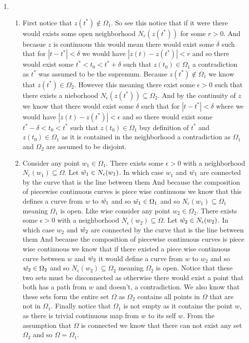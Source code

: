 \documentclass[12pt]{amsart}
\theoremstyle{definition}
\newcommand{\se}{\subseteq}
\begin{document}
\begin{enumerate}
\item 
\begin{enumerate}[label=(\alph*)]
    \item First notice that $z(t^*)\not\in \Omega_1$. So see this notice that if it were there would exists some open neighborhood $N_r(z(t^*))$ for some $r>0$. And becasue $z$ is continuous this would mean there would exist some $\delta$ such that for $|t-t^*|<\delta$ we would have $|z(t)-z(t^*)|<r$ and so there would exist some $t^*<t_0<t^*+\delta$ such that $z(t_0)\in\Omega_1$ a contradiction as $t^*$ was assumed to be the supremum. Because $z(t^*)\not\in\Omega_1$ we know that $z(t^*)\in \Omega_2$. However this meaning there exist some $\epsilon>0$ such that there exists a nieborhood $N_\epsilon(z(t^*))\se \Omega_2$. And by the continuity of $z$ we know that there would exist some $\delta$ such that for $|t-t^*|<\delta$ where we would have $|z(t)-z(t^*)|<\epsilon$ and so there would exist some $t^*-\delta<t_0<t^*$ such that $z(t_0)\in\Omega_1$ buy definition of $t^*$ and $z(t_0)\in\Omega_1$ as it is contained in the neighborhood a contradiction as $\Omega_1$ and $\Omega_2$ are assumed to be disjoint.
    \item Consider any point $w_1\in\Omega_1$. There exists some $\epsilon>0$ with a neighborhood $N_\epsilon(w_1)\se \Omega$. Let $\Tilde{w_1}\in N_\epsilon(w_1)$. In which case $w_1$ and $\Tilde{w_1}$ are connected by the curve that is the line between them %
    And because the composition of piecewise continuous curves is piece wise continuous we know that this defines a curve from $w$ to $\Tilde{w_1}$ and so $\Tilde{w_1}\in \Omega_1$ and so $N_\epsilon(w_1)\se \Omega_1$ meaning $\Omega_1$ is open. Like wise consider any point $w_2\in\Omega_2$. There exists some $\epsilon>0$ with a neighborhood $N_\epsilon(w_2)\se \Omega$. Let $\Tilde{w_2}\in N_\epsilon(w_2)$. In which case $w_2$ and $\Tilde{w_2}$ are connected by the curve that is the line between them %
    And because the composition of piecewise continuous curves is piece wise continuous we know that if there existed a piece wise continuous curve between $w$ and $\Tilde{w_2}$ it would define a curve from $w$ to $w_2$ and so $\Tilde{w_2}\in \Omega_2$ and so $N_\epsilon(w_2)\se \Omega_2$ meaning $\Omega_2$ is open. Notice that these two sets must be disconnected as otherwise there would exist a point that both has a path from $w$ and doesn't, a contradiction. We also know that these sets form the entire set $\Omega$ as $\Omega_2$ contains all points in $\Omega$ that are not in $\Omega_1$. Finally notice that $\Omega_1$ is not empty as it contains the point $w$, as there is trivial continuous map from $w$ to its self $w$. From the assumption that $\Omega$ is connected we know that there can not exist any set $\Omega_2$ and so $\Omega=\Omega_1$.\\

\end{enumerate}
\end{enumerate}
\end{document}
